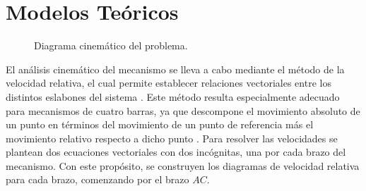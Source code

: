 \section{Modelos Teóricos}

\begin{figure}[!h]
  \centering
  \caption{Diagrama cinemático del problema.}
\end{figure}

El análisis cinemático del mecanismo se lleva a cabo mediante el método de la
velocidad relativa, el cual permite establecer relaciones vectoriales entre los
distintos eslabones del sistema \cite{hibbeler2016}. Este método resulta
especialmente adecuado para mecanismos de cuatro barras, ya que descompone el
movimiento absoluto de un punto en términos del movimiento de un punto de
referencia más el movimiento relativo respecto a dicho punto
\cite{meriam2018}. Para resolver las velocidades se plantean dos ecuaciones
vectoriales con dos incógnitas, una por cada brazo del mecanismo. Con este
propósito, se construyen los diagramas de velocidad relativa para cada brazo,
comenzando por el brazo $AC$.

